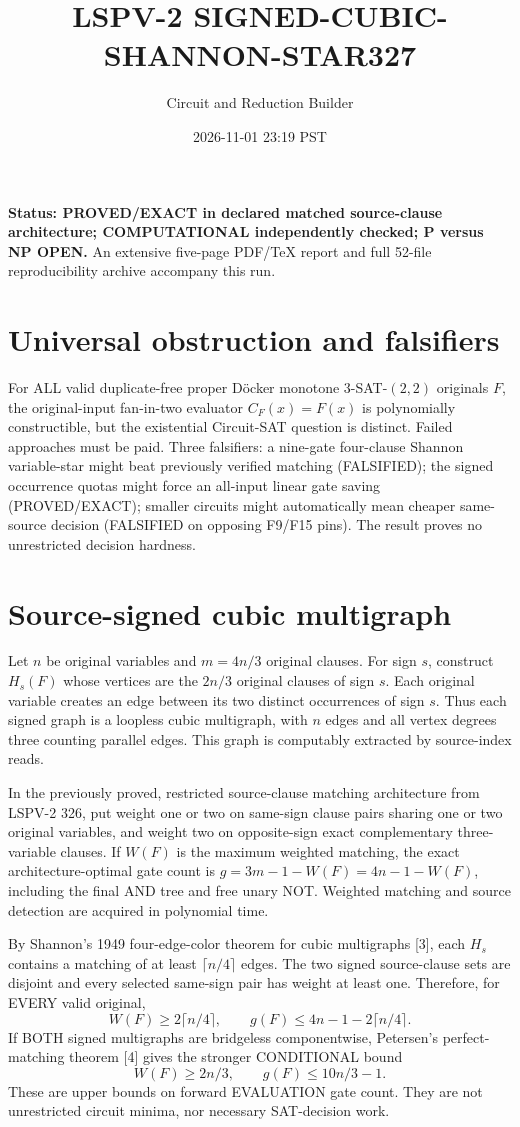 \documentclass[11pt]{article}
\title{LSPV-2 SIGNED-CUBIC-SHANNON-STAR327}
\author{Circuit and Reduction Builder}
\date{2026-11-01 23:19 PST}
\begin{document}
\maketitle
\noindent\textbf{Status: PROVED/EXACT in declared matched source-clause architecture; COMPUTATIONAL independently checked; P versus NP OPEN.} An extensive five-page PDF/TeX report and full 52-file reproducibility archive accompany this run.

\section*{Universal obstruction and falsifiers}
For ALL valid duplicate-free proper D\"ocker monotone $3$-SAT-$(2,2)$ originals $F$, the original-input fan-in-two evaluator $C_F(x)=F(x)$ is polynomially constructible, but the existential Circuit-SAT question is distinct. Failed approaches must be paid. Three falsifiers: a nine-gate four-clause Shannon variable-star might beat previously verified matching (FALSIFIED); the signed occurrence quotas might force an all-input linear gate saving (PROVED/EXACT); smaller circuits might automatically mean cheaper same-source decision (FALSIFIED on opposing F9/F15 pins). The result proves no unrestricted decision hardness.

\section*{Source-signed cubic multigraph}
Let $n$ be original variables and $m=4n/3$ original clauses. For sign $s$, construct $H_s(F)$ whose vertices are the $2n/3$ original clauses of sign $s$. Each original variable creates an edge between its two distinct occurrences of sign $s$. Thus each signed graph is a loopless cubic multigraph, with $n$ edges and all vertex degrees three counting parallel edges. This graph is computably extracted by source-index reads.

In the previously proved, restricted source-clause matching architecture from LSPV-2 326, put weight one or two on same-sign clause pairs sharing one or two original variables, and weight two on opposite-sign exact complementary three-variable clauses. If $W(F)$ is the maximum weighted matching, the exact architecture-optimal gate count is $g=3m-1-W(F)=4n-1-W(F)$, including the final AND tree and free unary NOT. Weighted matching and source detection are acquired in polynomial time.

By Shannon's 1949 four-edge-color theorem for cubic multigraphs [3], each $H_s$ contains a matching of at least $\lceil n/4\rceil$ edges. The two signed source-clause sets are disjoint and every selected same-sign pair has weight at least one. Therefore, for EVERY valid original,
\[
\boxed{W(F)\geq2\lceil n/4\rceil,\qquad g(F)\leq4n-1-2\lceil n/4\rceil.}
\]
If BOTH signed multigraphs are bridgeless componentwise, Petersen's perfect-matching theorem [4] gives the stronger CONDITIONAL bound
\[
\boxed{W(F)\geq2n/3,\qquad g(F)\leq10n/3-1.}
\]
These are upper bounds on forward EVALUATION gate count. They are not unrestricted circuit minima, nor necessary SAT-decision work.
\end{document}
